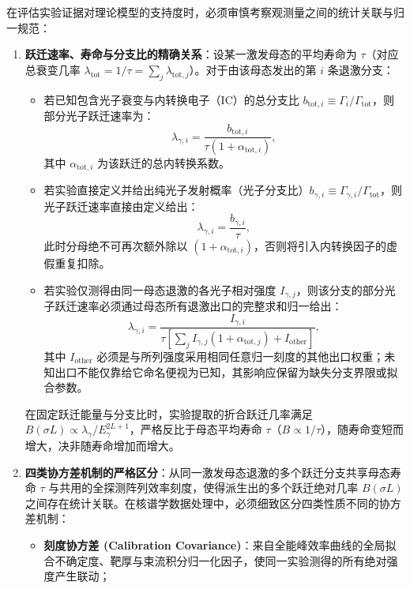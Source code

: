 在评估实验证据对理论模型的支持度时，必须审慎考察观测量之间的统计关联与归一规范：
\begin{enumerate}
\item \textbf{跃迁速率、寿命与分支比的精确关系}：设某一激发母态的平均寿命为 $\tau$（对应总衰变几率 $\lambda_{\mathrm{tot}} = 1/\tau = \sum_j \lambda_{\mathrm{tot}, j}$）。对于由该母态发出的第 $i$ 条退激分支：
\begin{itemize}
\item 若已知包含光子衰变与内转换电子（IC）的总分支比 $b_{\mathrm{tot}, i} \equiv \Gamma_i / \Gamma_{\mathrm{tot}}$，则部分光子跃迁速率为：
\begin{equation}\label{eq:3-8-b-rate-relation}
\lambda_{\gamma, i} = \frac{b_{\mathrm{tot}, i}}{\tau (1 + \alpha_{\mathrm{tot}, i})} ,
\end{equation}
其中 $\alpha_{\mathrm{tot}, i}$ 为该跃迁的总内转换系数。
\item 若实验直接定义并给出纯光子发射概率（光子分支比）$b_{\gamma, i} \equiv \Gamma_{\gamma, i} / \Gamma_{\mathrm{tot}}$，则光子跃迁速率直接由定义给出：
\begin{equation}\label{eq:3-8-b-rate-direct}
\lambda_{\gamma, i} = \frac{b_{\gamma, i}}{\tau} ,
\end{equation}
此时分母绝不可再次额外除以 $(1 + \alpha_{\mathrm{tot}, i})$，否则将引入内转换因子的虚假重复扣除。
\item 若实验仅测得由同一母态退激的各光子相对强度 $I_{\gamma, j}$，则该分支的部分光子跃迁速率必须通过母态所有退激出口的完整求和归一给出：
\begin{equation}\label{eq:3-8-lambda-relative}
\lambda_{\gamma, i} = \frac{I_{\gamma, i}}{\tau \left[ \sum_j I_{\gamma, j} (1 + \alpha_{\mathrm{tot}, j}) + I_{\mathrm{other}} \right]} ,
\end{equation}
其中 $I_{\mathrm{other}}$ 必须是与所列强度采用相同任意归一刻度的其他出口权重；未知出口不能仅靠给它命名便视为已知，其影响应保留为缺失分支界限或拟合参数。
\end{itemize}
在固定跃迁能量与分支比时，实验提取的折合跃迁几率满足 $B(\sigma L) \propto \lambda_\gamma / E_\gamma^{2L+1}$，严格反比于母态平均寿命 $\tau$（$B \propto 1/\tau$），随寿命变短而增大，决非随寿命增加而增大。
\item \textbf{四类协方差机制的严格区分}：从同一激发母态退激的多个跃迁分支共享母态寿命 $\tau$ 与共用的全探测阵列效率刻度，使得派生出的多个跃迁绝对几率 $B(\sigma L)$ 之间存在统计关联。在核谱学数据处理中，必须细致区分四类性质不同的协方差机制：
\begin{itemize}
\item \textbf{刻度协方差 (Calibration Covariance)}：来自全能峰效率曲线的全局拟合不确定度、靶厚与束流积分归一化因子，使同一实验测得的所有绝对强度产生联动；

\end{itemize}
\end{enumerate}
